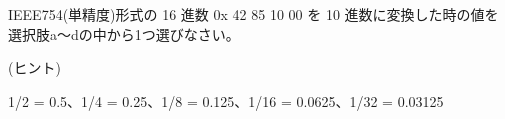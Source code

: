 IEEE754(単精度)形式の 16 進数 0x 42 85 10 00 を 10 進数に変換した時の値を選択肢a〜dの中から1つ選びなさい。

(ヒント)

1/2 = 0.5、1/4 = 0.25、1/8 = 0.125、1/16 = 0.0625、1/32 = 0.03125

